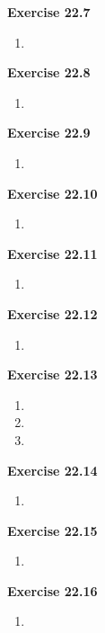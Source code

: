 \textbf{Exercise 22.7}
\begin{enumerate}
    \item 
\end{enumerate}

\textbf{Exercise 22.8}
\begin{enumerate}
    \item 
\end{enumerate}

\textbf{Exercise 22.9}
\begin{enumerate}
    \item 
\end{enumerate}

\textbf{Exercise 22.10}
\begin{enumerate}
    \item 
\end{enumerate}

\textbf{Exercise 22.11}
\begin{enumerate}
    \item 
\end{enumerate}

\textbf{Exercise 22.12}
\begin{enumerate}
    \item 
\end{enumerate}

\textbf{Exercise 22.13}
\begin{enumerate}
    \item 
    \item 
    \item 
\end{enumerate}

\textbf{Exercise 22.14}
\begin{enumerate}
    \item 
\end{enumerate}

\textbf{Exercise 22.15}
\begin{enumerate}
    \item 
\end{enumerate}

\textbf{Exercise 22.16}
\begin{enumerate}
    \item 
\end{enumerate}

